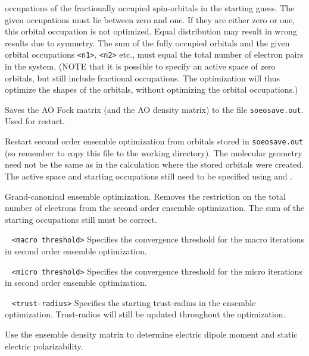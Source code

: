 \begin{description}
occupations of the fractionally occupied spin-orbitals in the starting guess. The given occupations must lie between zero and one. If they are either zero 
or one, this orbital occupation is not optimized. Equal distribution may result in wrong results due to symmetry. The sum of the fully occupied orbitals and 
the given orbital occupations \verb|<n1>|, \verb|<n2>| etc., must equal the total number of electron pairs in the system. (NOTE that it is possible to 
specify an active space of zero orbitals, but still include fractional occupations. The optimization will thus optimize the shapes of the orbitals, without 
optimizing the orbital occupations.)
\item[\Key{SOEOSAVE}] 
Saves the AO Fock matrix (and the AO density matrix) to the file \verb|soeosave.out|. Used for restart.
\item[\Key{SOEORST}] 
Restart second order ensemble optimization from orbitals stored in \verb|soeosave.out| (so remember to copy this file to the working directory). 
The molecular geometry need not be the same as in the calculation 
where the stored orbitals were created. The active space and starting occupations still need to be specified using  and .
\item[\Key{SOEOGC}] 
Grand-canonical ensemble optimization. Removes the restriction on the total number of electrons from the second order ensemble optimization. The sum of the 
starting occupations still must be correct.
\item[\Key{SOEOMATHR}] \verb| | \newline
\verb|<macro threshold>|\newline 
Specifies the convergence threshold for the macro iterations in second order ensemble optimization.
\item[\Key{SOEOMITHR}] \verb| | \newline
\verb|<micro threshold>|\newline 
Specifies the convergence threshold for the micro iterations in second order ensemble optimization.
\item[\Key{SOEOTRUST}] \verb| | \newline
\verb|<trust-radius>|\newline 
Specifies the starting trust-radius in the ensemble optimization. Trust-radius will still be updated throughout the optimization.
\item[\Key{SOEODIPOLE}] Use the ensemble density matrix to determine electric dipole moment and static electric polarizability.
\item[\Key{START}] \verb| | \newline

\end{description}
